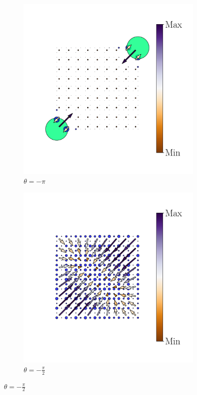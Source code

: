 \begin{figure}[h!]
     
     \begin{minipage}[h!]{1.1\textwidth}
          \begin{subfigure}[b!]{0.2 \textwidth}
             \caption{$\theta = -\pi$}
             \includegraphics[width=\textwidth]{Imagenes/Resultados_pump_Cuadrado/xy/hoti_pomp_xy_neg1.pdf}
         \end{subfigure}\hspace*{-0.5em}
          \begin{subfigure}[b!]{0.2 \textwidth}
             \caption*{$\theta = -\frac{\pi}{2}$}
             \includegraphics[width=\textwidth]{Imagenes/Resultados_pump_Cuadrado/xy/hoti_pomp_xy_neg2.pdf}

\end{subfigure}
\end{minipage}
\end{figure}
